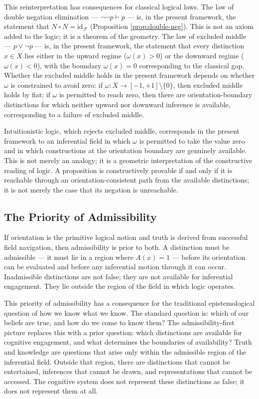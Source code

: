 \documentclass[12pt]{article}
\theoremstyle{remark}
\begin{document}
This reinterpretation has consequences for classical logical laws. The
law of double negation elimination --- $\neg\neg p \vdash p$ --- is,
in the present framework, the statement that $N \circ N =
\mathrm{id}_{\mathcal{F}}$ (Proposition \ref{prop:double-neg}). This is
not an axiom added to the logic; it is a theorem of the geometry. The
law of excluded middle --- $p \vee \neg p$ --- is, in the present
framework, the statement that every distinction $x \in X$ lies either
in the upward regime ($\omega(x) > 0$) or the downward regime
($\omega(x) < 0$), with the boundary $\omega(x) = 0$ corresponding to
the classical gap. Whether the excluded middle holds in the present
framework depends on whether $\omega$ is constrained to avoid zero:
if $\omega : X \to [-1,+1] \setminus \{0\}$, then excluded middle
holds by fiat; if $\omega$ is permitted to reach zero, then there are
orientation-boundary distinctions for which neither upward nor downward
inference is available, corresponding to a failure of excluded middle.

Intuitionistic logic, which rejects excluded middle, corresponds in the
present framework to an inferential field in which $\omega$ is permitted
to take the value zero and in which constructions at the orientation
boundary are genuinely available. This is not merely an analogy; it is
a geometric interpretation of the constructive reading of logic. A
proposition is constructively provable if and only if it is reachable
through an orientation-consistent path from the available distinctions;
it is not merely the case that its negation is unreachable.

\subsection{The Priority of Admissibility}

If orientation is the primitive logical notion and truth is derived from
successful field navigation, then admissibility is prior to both. A
distinction must be admissible --- it must lie in a region where $A(x)
= 1$ --- before its orientation can be evaluated and before any
inferential motion through it can occur. Inadmissible distinctions are
not false; they are not available for inferential engagement. They lie
outside the region of the field in which logic operates.

This priority of admissibility has a consequence for the traditional
epistemological question of how we know what we know. The standard
question is: which of our beliefs are true, and how do we come to know
them? The admissibility-first picture replaces this with a prior
question: which distinctions are available for cognitive engagement, and
what determines the boundaries of availability? Truth and knowledge are
questions that arise only within the admissible region of the
inferential field. Outside that region, there are distinctions that
cannot be entertained, inferences that cannot be drawn, and
representations that cannot be accessed. The cognitive system does not
represent these distinctions as false; it does not represent them at
all.
\end{document}
